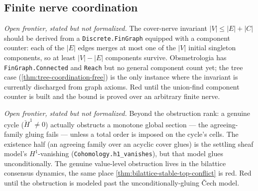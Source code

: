 \subsection{Finite nerve coordination}

\begin{theorem}\label{thm:fingraph-components-count}\notready{}
\emph{Open frontier, stated but not formalized.} The cover-nerve invariant
$|V|\le|E|+|C|$ should be derived from a \texttt{Discrete.FinGraph} equipped
with a component counter: each of the $|E|$ edges merges at most one of the
$|V|$ initial singleton components, so at least $|V|-|E|$ components survive.
Obsmetrologia has \texttt{FinGraph.Connected} and \texttt{Reach} but no general
component count yet; the tree case (\cref{thm:tree-coordination-free}) is the
only instance where the invariant is currently discharged from graph axioms.
Red until the union-find component counter is built and the bound is proved
over an arbitrary finite nerve.
\end{theorem}

\begin{theorem}\label{thm:coordination-value-converse}\notready{}
\emph{Open frontier, stated but not formalized.} Beyond the obstruction rank:
a genuine cycle ($\check H^1\neq0$) actually obstructs a monotone global
section --- the agreeing-family gluing fails --- unless a total order is
imposed on the cycle's cells. The existence half (an agreeing family over an
acyclic cover glues) is the settling sheaf model's $H^1$-vanishing
(\texttt{Cohomology.h1\_vanishes}), but that model glues unconditionally. The
genuine value-level obstruction lives in the bilattice consensus dynamics, the
same place \cref{thm:bilattice-stable-top-conflict} is red. Red until the
obstruction is modeled past the unconditionally-gluing \v{C}ech model.
\end{theorem}
